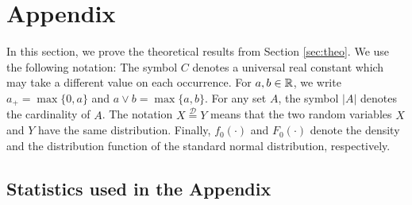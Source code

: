 \documentclass[a4paper,12pt]{article}
\begin{document}
\section{Appendix}\label{sec-appendix}
In this section, we prove the theoretical results from Section \ref{sec:theo}. We use the following notation: The symbol $C$ denotes a universal real constant which may take a different value on each occurrence. For $a,b \in \mathbb{R}$, we write $a_+ = \max \{0,a\}$ and $a \vee b = \max\{a,b\}$. For any set $A$, the symbol $|A|$ denotes the cardinality of $A$. The notation $X \stackrel{\mathcal{D}}{=} Y$ means that the two random variables $X$ and $Y$ have the same distribution. Finally, $f_0(\cdot)$ and $F_0(\cdot)$ denote the density and the distribution function of the standard normal distribution, respectively.

\subsection{Statistics used in the Appendix}\label{subsec-appendix-stats}
\end{document}
